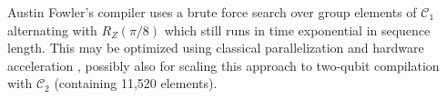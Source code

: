 Austin Fowler's compiler uses a brute force search over group elements of
$\mathcal{C}_1$ alternating with $R_Z(\pi/8)$ which still runs in time
exponential in sequence length.
This may be optimized using classical parallelization and hardware acceleration
\cite{Booth2012}, possibly also for scaling this approach to
two-qubit compilation with $\mathcal{C}_2$ (containing 11,520
elements).